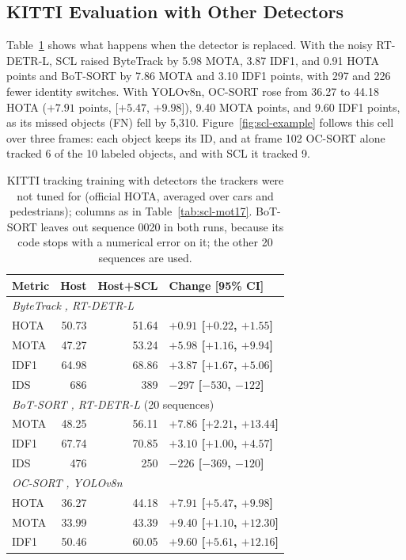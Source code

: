 \subsection{KITTI Evaluation with Other Detectors}\label{sec:scl-res-kitti}
Table~\ref{tab:scl-kitti} shows what happens when the detector is replaced. With the noisy RT-DETR-L, SCL raised ByteTrack by 5.98 MOTA, 3.87 IDF1, and 0.91 HOTA points and BoT-SORT by 7.86 MOTA and 3.10 IDF1 points, with 297 and 226 fewer identity switches. With YOLOv8n, OC-SORT rose from 36.27 to 44.18 HOTA ($+7.91$ points, [$+5.47$, $+9.98$]), 9.40 MOTA points, and 9.60 IDF1 points, as its missed objects (FN) fell by 5,310. Figure~\ref{fig:scl-example} follows this cell over three frames: each object keeps its ID, and at frame 102 OC-SORT alone tracked 6 of the 10 labeled objects, and with SCL it tracked 9.

\begin{table}[tbp]
\centering
\caption{KITTI tracking training with detectors the trackers were not tuned for (official HOTA, averaged over cars and pedestrians); columns as in Table~\ref{tab:scl-mot17}. BoT-SORT leaves out sequence 0020 in both runs, because its code stops with a numerical error on it; the other 20 sequences are used.}
\label{tab:scl-kitti}
\begin{tabular}{lrrl}
\toprule
Metric & Host & Host+SCL & Change [95\% CI]\\
\midrule
\multicolumn{4}{l}{\textit{ByteTrack} \cite{zhang2022bytetrack}\textit{, RT-DETR-L}}\\
\quad HOTA & 50.73 & 51.64 & \textbf{$+0.91$ [$+0.22$, $+1.55$]}\\
\quad MOTA & 47.27 & 53.24 & \textbf{$+5.98$ [$+1.16$, $+9.94$]}\\
\quad IDF1 & 64.98 & 68.86 & \textbf{$+3.87$ [$+1.67$, $+5.06$]}\\
\quad IDS & 686 & 389 & \textbf{$-297$ [$-530$, $-122$]}\\
\multicolumn{4}{l}{\textit{BoT-SORT} \cite{aharon2022botsort}\textit{, RT-DETR-L} (20 sequences)}\\
\quad MOTA & 48.25 & 56.11 & \textbf{$+7.86$ [$+2.21$, $+13.44$]}\\
\quad IDF1 & 67.74 & 70.85 & \textbf{$+3.10$ [$+1.00$, $+4.57$]}\\
\quad IDS & 476 & 250 & \textbf{$-226$ [$-369$, $-120$]}\\
\multicolumn{4}{l}{\textit{OC-SORT} \cite{cao2023ocsort}\textit{, YOLOv8n}}\\
\quad HOTA & 36.27 & 44.18 & \textbf{$+7.91$ [$+5.47$, $+9.98$]}\\
\quad MOTA & 33.99 & 43.39 & \textbf{$+9.40$ [$+1.10$, $+12.30$]}\\
\quad IDF1 & 50.46 & 60.05 & \textbf{$+9.60$ [$+5.61$, $+12.16$]}\\
\bottomrule
\end{tabular}
\end{table}


